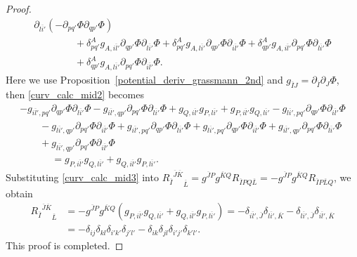 \documentclass[10pt,a4paper]{amsart}
\numberwithin{equation}{section}
\begin{document}
\begin{proof}
\begin{gather}
 \partial_{\overline{li'}}
 (
 -
 \partial_{pq'}\Phi
 \partial_{qp'}\Phi
 )
 \nonumber
 \\
 \phantom{\qquad
 +=}{}
 +
 \delta^{A}_{pq'}
 g_{A,\overline{il'}}
 \partial_{qp'}\Phi
 \partial_{\overline{li'}}\Phi
 +
 \delta^{A}_{pq'}
 g_{A,\overline{li'}}
 \partial_{qp'}\Phi
 \partial_{\overline{il'}}\Phi
 +
 \delta^{A}_{qp'}
 g_{A,\overline{il'}}
 \partial_{pq'}\Phi
 \partial_{\overline{li'}}\Phi \nonumber
 \\
 \phantom{\qquad
 +=}{}
 +
 \delta^{A}_{qp'}
 g_{A,\overline{li'}}
 \partial_{pq'}\Phi
 \partial_{\overline{il'}}\Phi.
 \label{curv_calc_mid2}
\end{gather}
Here we use Proposition~\ref{potential_deriv_grassmann_2nd} and
$
 g_{\overline{I}J}
 =
 \partial_{\overline{I}}
 \partial_{J}
 \Phi
$,
then \eqref{curv_calc_mid2} becomes
\begin{gather}
 -
 g_{\overline{il'},pq'}
 \partial_{qp'}\Phi
 \partial_{\overline{li'}}\Phi
 -
 g_{\overline{il'},qp'}
 \partial_{pq'}\Phi
 \partial_{\overline{li'}}\Phi
 +
 g_{Q,\overline{il'}}
 g_{P,\overline{li'}}
 +
 g_{P,\overline{il'}}
 g_{Q,\overline{li'}}
 -
 g_{\overline{li'},pq'}
 \partial_{qp'}\Phi
 \partial_{\overline{il'}}\Phi
 \nonumber
 \\
 \qquad
 {}-
 g_{\overline{li'},qp'}
 \partial_{pq'}\Phi
 \partial_{\overline{il'}}\Phi
 +
 g_{\overline{il'},pq'}
 \partial_{qp'}\Phi
 \partial_{\overline{li'}}\Phi
 +
 g_{\overline{li'},pq'}
 \partial_{qp'}\Phi
 \partial_{\overline{il'}}\Phi
 +
 g_{\overline{il'},qp'}
 \partial_{pq'}\Phi
 \partial_{\overline{li'}}\Phi \nonumber
 \\
 \qquad
 {}+
 g_{\overline{li'},qp'}
 \partial_{pq'}\Phi
 \partial_{\overline{il'}}\Phi
 \nonumber
 \\
 \phantom{
 \qquad+}{}=
 g_{P,\overline{il'}}
 g_{Q,\overline{li'}}
 +
 g_{Q,\overline{il'}}
 g_{P,\overline{li'}}.
 \label{curv_calc_mid3}
\end{gather}
Substituting \eqref{curv_calc_mid3} into
$
 {{R_{\overline{I}}}^{\overline{J} \overline{K}}}_{\overline{L}}
 =
 g^{\overline{J}P}
 g^{\overline{K}Q}
 R_{\overline{I}PQ\overline{L}}
 =
 -
 g^{\overline{J}P}
 g^{\overline{K}Q}
 R_{\overline{I}P\overline{L}Q}
$,
we obtain
\begin{align*}
 {{R_{\overline{I}}}^{\overline{J} \overline{K}}}_{\overline{L}}
 &=
 -
 g^{\overline{J}P}
 g^{\overline{K}Q}
 (
 g_{P,\overline{il'}}
 g_{Q,\overline{li'}}
 +
 g_{Q,\overline{il'}}
 g_{P,\overline{li'}}
 )
=
 -
 \delta_{
 \overline{il'},
 \overline{J}
 }
 \delta_{
 \overline{li'},
 \overline{K}
 }
 -
 \delta_{
 \overline{li'},
 \overline{J}
 }
 \delta_{
 \overline{il'},
 \overline{K}
 }
 \\
 &=
 -
 \delta_{ij}
 \delta_{kl}
 \delta_{i'k'}
 \delta_{j'l'}
 -
 \delta_{ik}
 \delta_{jl}
 \delta_{i'j'}
 \delta_{k'l'}.
\end{align*}
This proof is completed.
\end{proof}
\end{document}
